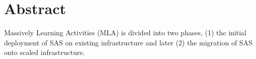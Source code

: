 \section*{Abstract}

\textcolor{red}{\lipsum[1-4]}

Massively Learning Activities (MLA) is divided into two phases, (1) the initial deployment of SAS on existing infrastructure and later (2) the migration of SAS onto scaled infrastructure.